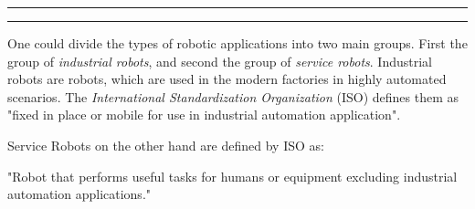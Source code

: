         \vspace{10px}
        \hrule
        \vspace{10px}


        \vspace{10px}
        \hrule
        \vspace{10px}

        One could divide the types of robotic applications into two main groups. First the group of \emph{industrial robots}, and second the group of \emph{service robots}. 
        Industrial robots are robots, which are used in the modern factories in highly automated scenarios. The \emph{International Standardization Organization} (ISO) defines them as "fixed in place or mobile for use in industrial automation application". 
        
        Service Robots on the other hand are defined by ISO as:
        \begin{displayquote}
            "Robot that performs useful tasks for humans or equipment excluding industrial automation applications."
        \end{displayquote} 

